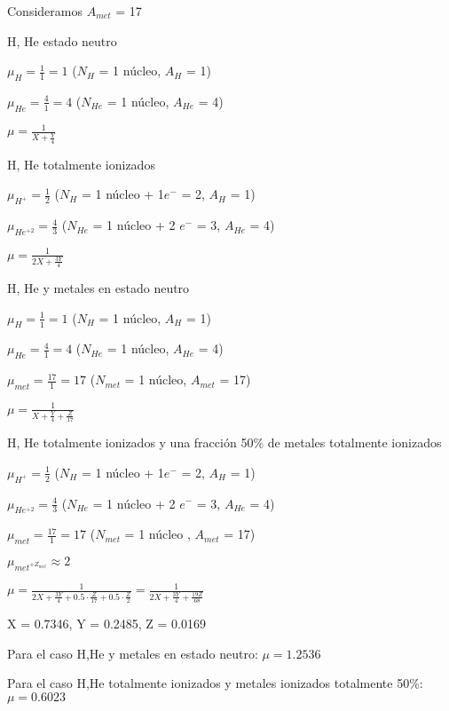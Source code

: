 \documentclass[10pt]{book}
\begin{document}
Consideramos $A_{met}$ = 17

\begin{description}
\item H, He estado neutro

$ \mu_H  = \frac{1}{1} = 1$ ($N_H$ = 1 núcleo, $A_H$ = 1)

$ \mu_{He}  = \frac{4}{1} = 4$ ($N_{He}$ = 1 núcleo, $A_{He}$ = 4)

$ \mu = \frac{1}{X + \frac{Y}{4}}$
 
\item H, He totalmente ionizados

$ \mu_{H^+}  = \frac{1}{2} $ ($N_H$ = 1 núcleo + 1$e^-$ = 2, $A_H$ = 1)

$ \mu_{He^{+2}}  = \frac{4}{3} $ ($N_{He}$ = 1 núcleo + 2 $e^-$ = 3, $A_{He}$ = 4)

$ \mu = \frac{1}{2X + \frac{3Y}{4}}$

\item H, He y metales en estado neutro

$ \mu_H  = \frac{1}{1} = 1$ ($N_H$ = 1 núcleo, $A_H$ = 1)

$ \mu_{He}  = \frac{4}{1} = 4$ ($N_{He}$ = 1 núcleo, $A_{He}$ = 4)

$ \mu_{met}  = \frac{17}{1} = 17$ ($N_{met}$ = 1 núcleo, $A_{met}$ = 17)

$ \mu = \frac{1}{X + \frac{Y}{4} + \frac{Z}{17}}$

\item H, He totalmente ionizados y una fracción 50\% de metales  totalmente ionizados

$ \mu_{H^+}  = \frac{1}{2} $ ($N_H$ = 1 núcleo + 1$e^-$ = 2, $A_H$ = 1)

$ \mu_{He^{+2}}  = \frac{4}{3} $ ($N_{He}$ = 1 núcleo + 2 $e^-$ = 3, $A_{He}$ = 4)

$ \mu_{met}  = \frac{17}{1} = 17 $ ($N_{met}$ = 1 núcleo , $A_{met}$ = 17)

$ \mu_{met^{+Z_{met}}}  \approx 2  $ 

$ \mu = \frac{1}{2 X + \frac{3 Y}{4} + 0.5 \cdot \frac{Z}{17} + 0.5 \cdot \frac{Z}{2} } = \frac{1}{2 X + \frac{3 Y}{4} + \frac{19 Z}{68} }$

\item X = 0.7346, Y = 0.2485, Z = 0.0169

Para el caso H,He y metales en estado neutro:  $ \mu = 1.2536$

Para el caso H,He totalmente ionizados y metales ionizados totalmente 50\%:  $\mu = 0.6023$


\end{description}
\end{document}
